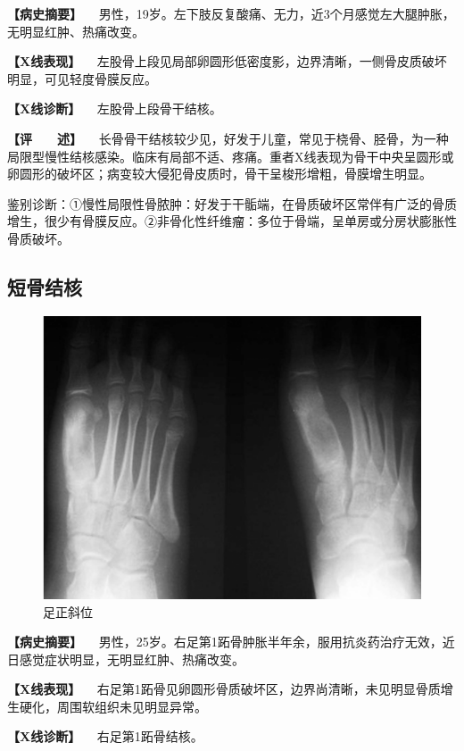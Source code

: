 \textbf{【病史摘要】}
　男性，19岁。左下肢反复酸痛、无力，近3个月感觉左大腿肿胀，无明显红肿、热痛改变。

\textbf{【X线表现】}
　左股骨上段见局部卵圆形低密度影，边界清晰，一侧骨皮质破坏明显，可见轻度骨膜反应。

\textbf{【X线诊断】} 　左股骨上段骨干结核。

\textbf{【评　　述】}
　长骨骨干结核较少见，好发于儿童，常见于桡骨、胫骨，为一种局限型慢性结核感染。临床有局部不适、疼痛。重者X线表现为骨干中央呈圆形或卵圆形的破坏区；病变较大侵犯骨皮质时，骨干呈梭形增粗，骨膜增生明显。

鉴别诊断：①慢性局限性骨脓肿：好发于干骺端，在骨质破坏区常伴有广泛的骨质增生，很少有骨膜反应。②非骨化性纤维瘤：多位于骨端，呈单房或分房状膨胀性骨质破坏。

\subsection{短骨结核}

\begin{figure}[!htbp]
 \centering
 \includegraphics{./images/Image00078.jpg}
 \captionsetup{justification=centering}
 \caption{足正斜位}
 \label{fig2-6-3}
  \end{figure} 

\textbf{【病史摘要】}
　男性，25岁。右足第1跖骨肿胀半年余，服用抗炎药治疗无效，近日感觉症状明显，无明显红肿、热痛改变。

\textbf{【X线表现】}
　右足第1跖骨见卵圆形骨质破坏区，边界尚清晰，未见明显骨质增生硬化，周围软组织未见明显异常。

\textbf{【X线诊断】} 　右足第1跖骨结核。

